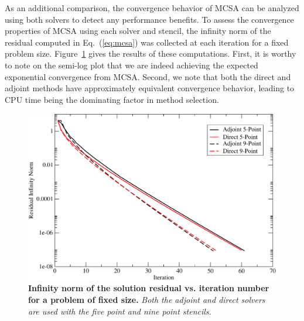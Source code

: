 As an additional comparison, the convergence behavior of MCSA can be
analyzed using both solvers to detect any performance benefits. To
assess the convergence properties of MCSA using each solver and
stencil, the infinity norm of the residual computed in
Eq.~(\ref{eq:mcsa}) was collected at each iteration for a fixed
problem size. Figure~\ref{fig:poisson_convergence} gives the results
of these computations. First, it is worthy to note on the semi-log plot
that we are indeed achieving the expected exponential convergence from
MCSA. Second, we note that both the direct and adjoint methods have
approximately equivalent convergence behavior, leading to CPU time
being the dominating factor in method selection.
\begin{figure}[h!]
  \centering
  \includegraphics[width=5in,clip]{chapters/research_proposal/Adjoint_Direct_Convergence.pdf}
  \caption{\textbf{Infinity norm of the solution residual
      vs. iteration number for a problem of fixed size.} \textit{Both
      the adjoint and direct solvers are used with the five point and
      nine point stencils.}}
  \label{fig:poisson_convergence}
\end{figure}

